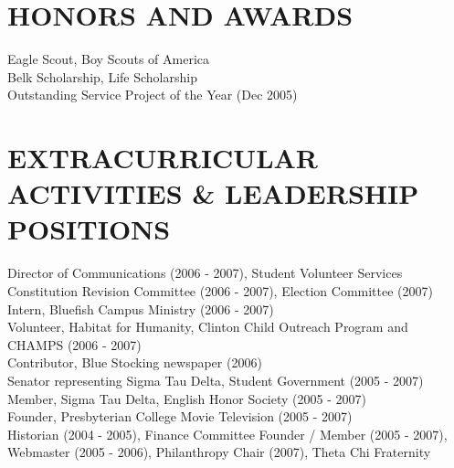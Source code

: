 \documentclass{res}
\begin{document}
\begin{resume}
\section{HONORS AND AWARDS}          
    Eagle Scout, Boy Scouts of America \\
    Belk Scholarship, Life Scholarship \\
    Outstanding Service Project of the Year (Dec 2005)   
       
 
\section{EXTRACURRICULAR ACTIVITIES \& LEADERSHIP POSITIONS}          
    Director of Communications (2006 - 2007), Student Volunteer Services\\
    Constitution Revision Committee (2006 - 2007), Election Committee (2007)\\
    Intern, Bluefish Campus Ministry (2006 - 2007)\\
    Volunteer, Habitat for Humanity, Clinton Child Outreach Program and CHAMPS (2006 - 2007)\\
    Contributor, Blue Stocking newspaper (2006)\\
    Senator representing Sigma Tau Delta, Student Government (2005 - 2007)\\
    Member, Sigma Tau Delta, English Honor Society (2005 - 2007)\\
    Founder, Presbyterian College Movie Television (2005 - 2007)\\
    Historian (2004 - 2005), Finance Committee Founder / Member (2005 - 2007), Webmaster (2005 - 2006), Philanthropy Chair (2007), Theta Chi Fraternity
         
 
\end{resume}
\end{document}
